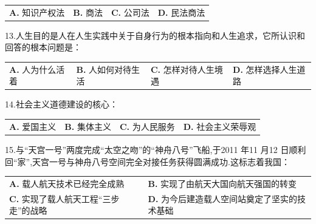 \documentclass[UTF8,11pt]{ctexart}
\begin{document}
\begin{center}\begin{tabular}{>{\raggedright\arraybackslash}p{\dimexpr(\linewidth-8\tabcolsep)/4\relax}>{\raggedright\arraybackslash}p{\dimexpr(\linewidth-8\tabcolsep)/4\relax}>{\raggedright\arraybackslash}p{\dimexpr(\linewidth-8\tabcolsep)/4\relax}>{\raggedright\arraybackslash}p{\dimexpr(\linewidth-8\tabcolsep)/4\relax}}
\textbf{A.} 知识产权法 & \textbf{B.} 商法 & \textbf{C.} 公司法 & \textbf{D.} 民法商法\\[.35em]\end{tabular}\end{center}

13.人生目的是人在人生实践中关于自身行为的根本指向和人生追求，它所认识和回答的根本问题是：


\begin{center}\begin{tabular}{>{\raggedright\arraybackslash}p{\dimexpr(\linewidth-8\tabcolsep)/4\relax}>{\raggedright\arraybackslash}p{\dimexpr(\linewidth-8\tabcolsep)/4\relax}>{\raggedright\arraybackslash}p{\dimexpr(\linewidth-8\tabcolsep)/4\relax}>{\raggedright\arraybackslash}p{\dimexpr(\linewidth-8\tabcolsep)/4\relax}}
\textbf{A.} 人为什么活着 & \textbf{B.} 人如何对待生活 & \textbf{C.} 怎样对待人生境遇 & \textbf{D.} 怎样选择人生道路\\[.35em]\end{tabular}\end{center}

14.社会主义道德建设的核心：


\begin{center}\begin{tabular}{>{\raggedright\arraybackslash}p{\dimexpr(\linewidth-8\tabcolsep)/4\relax}>{\raggedright\arraybackslash}p{\dimexpr(\linewidth-8\tabcolsep)/4\relax}>{\raggedright\arraybackslash}p{\dimexpr(\linewidth-8\tabcolsep)/4\relax}>{\raggedright\arraybackslash}p{\dimexpr(\linewidth-8\tabcolsep)/4\relax}}
\textbf{A.} 爱国主义 & \textbf{B.} 集体主义 & \textbf{C.} 为人民服务 & \textbf{D.} 社会主义荣辱观\\[.35em]\end{tabular}\end{center}

15.与“天宫一号”两度完成“太空之吻”的“神舟八号”飞船,于2011 年11 月12 日顺利回“家”,天宫一号与神舟八号空间完全对接任务获得圆满成功.这标志着我国：


\begin{center}\begin{tabular}{>{\raggedright\arraybackslash}p{\dimexpr(\linewidth-4\tabcolsep)/2\relax}>{\raggedright\arraybackslash}p{\dimexpr(\linewidth-4\tabcolsep)/2\relax}}
\textbf{A.} 载人航天技术已经完全成熟 & \textbf{B.} 实现了由航天大国向航天强国的转变\\[.35em]
\textbf{C.} 实现了载人航天工程“三步走”的战略 & \textbf{D.} 为今后建造载人空间站奠定了坚实的技术基础\\[.35em]\end{tabular}\end{center}
\end{document}
